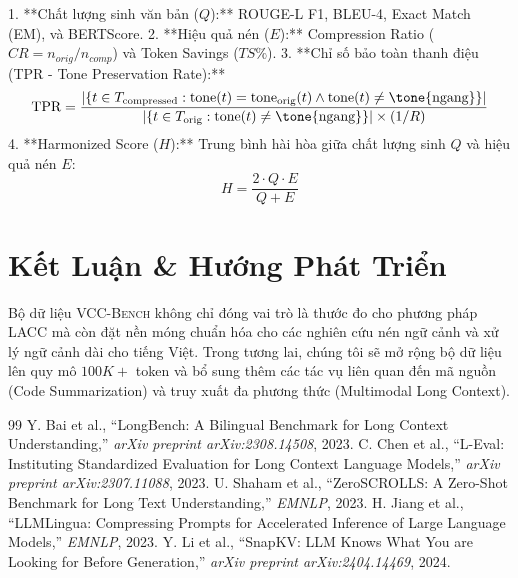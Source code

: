 \documentclass[12pt,a4paper]{article}
\newcommand{\method}[1]{\textsc{#1}}
\begin{document}
1. **Chất lượng sinh văn bản ($Q$):** ROUGE-L F1, BLEU-4, Exact Match (EM), và BERTScore.
2. **Hiệu quả nén ($E$):** Compression Ratio ($CR = n_{orig} / n_{comp}$) và Token Savings ($TS\%$).
3. **Chỉ số bảo toàn thanh điệu (TPR - Tone Preservation Rate):**
   \begin{equation}
       \text{TPR} = \frac{|\{t \in T_{\text{compressed}} : \text{tone}(t) = \text{tone}_{\text{orig}}(t) \land \text{tone}(t) \neq \text{\tone{ngang}}\}|}{|\{t \in T_{\text{orig}} : \text{tone}(t) \neq \text{\tone{ngang}}\}| \times (1/R)}
   \end{equation}
4. **Harmonized Score ($H$):** Trung bình hài hòa giữa chất lượng sinh $Q$ và hiệu quả nén $E$:
   \begin{equation}
       H = \frac{2 \cdot Q \cdot E}{Q + E}
   \end{equation}

\section{Kết Luận & Hướng Phát Triển}

Bộ dữ liệu \method{VCC-Bench} không chỉ đóng vai trò là thước đo cho phương pháp \method{LACC} mà còn đặt nền móng chuẩn hóa cho các nghiên cứu nén ngữ cảnh và xử lý ngữ cảnh dài cho tiếng Việt. Trong tương lai, chúng tôi sẽ mở rộng bộ dữ liệu lên quy mô $100K+$ token và bổ sung thêm các tác vụ liên quan đến mã nguồn (Code Summarization) và truy xuất đa phương thức (Multimodal Long Context).

\begin{thebibliography}{99}
 Y. Bai et al., ``LongBench: A Bilingual Benchmark for Long Context Understanding,'' \textit{arXiv preprint arXiv:2308.14508}, 2023.
 C. Chen et al., ``L-Eval: Instituting Standardized Evaluation for Long Context Language Models,'' \textit{arXiv preprint arXiv:2307.11088}, 2023.
 U. Shaham et al., ``ZeroSCROLLS: A Zero-Shot Benchmark for Long Text Understanding,'' \textit{EMNLP}, 2023.
 H. Jiang et al., ``LLMLingua: Compressing Prompts for Accelerated Inference of Large Language Models,'' \textit{EMNLP}, 2023.
 Y. Li et al., ``SnapKV: LLM Knows What You are Looking for Before Generation,'' \textit{arXiv preprint arXiv:2404.14469}, 2024.
\end{thebibliography}
\end{document}
